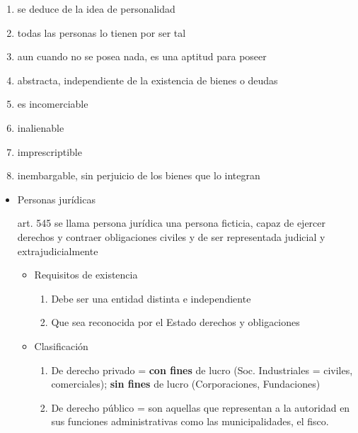 \documentclass[]{article}
\providecommand{\tightlist}{%
  \setlength{\itemsep}{0pt}\setlength{\parskip}{0pt}}
\begin{document}
\begin{itemize}
\begin{itemize}
\begin{enumerate}
\begin{itemize}
\begin{itemize}
\begin{itemize}
            \begin{enumerate}
            \def\labelenumii{\arabic{enumii}.}
            \tightlist
            \item
              se deduce de la idea de personalidad
            \item
              todas las personas lo tienen por ser tal
            \item
              aun cuando no se posea nada, es una aptitud para poseer
            \item
              abstracta, independiente de la existencia de bienes o
              deudas
            \item
              es incomerciable
            \item
              inalienable
            \item
              imprescriptible
            \item
              inembargable, sin perjuicio de los bienes que lo integran
            \end{enumerate}
          \end{itemize}
        \end{itemize}
      \end{itemize}
    \end{enumerate}

    \begin{itemize}
    \item
      Personas jurídicas

      art. 545 se llama persona jurídica una persona ficticia, capaz de
      ejercer derechos y contraer obligaciones civiles y de ser
      representada judicial y extrajudicialmente

      \begin{itemize}
      \item
        Requisitos de existencia

        \begin{enumerate}
        \def\labelenumi{\arabic{enumi}.}
        \tightlist
        \item
          Debe ser una entidad distinta e independiente
        \item
          Que sea reconocida por el Estado derechos y obligaciones
        \end{enumerate}
      \item
        Clasificación

        \begin{enumerate}
        \def\labelenumi{\arabic{enumi}.}
        \tightlist
        \item
          De derecho privado = \textbf{con fines} de lucro (Soc.
          Industriales = civiles, comerciales); \textbf{sin fines} de
          lucro (Corporaciones, Fundaciones)
        \item
          De derecho público = son aquellas que representan a la
          autoridad en sus funciones administrativas como las
          municipalidades, el fisco.
        \end{enumerate}


\end{itemize}
\end{itemize}
\end{itemize}
\end{itemize}
\end{document}

